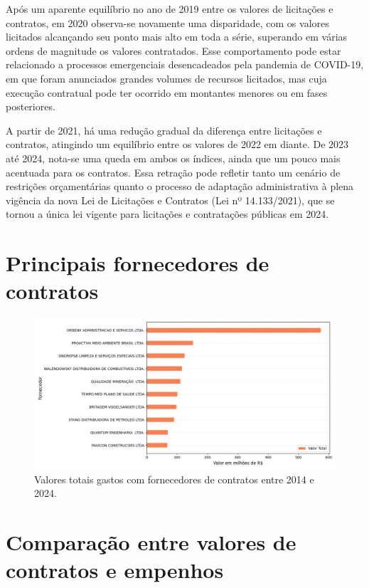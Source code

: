 \documentclass[
	12pt,				%
	oneside,			%
	a4paper,			%
	chapter=TITLE,		%
	section=TITLE,		%
	english,			%
	brazil				%
	]{abntex2}
\begin{document}
Após um aparente equilíbrio no ano de 2019 entre os valores de licitações e contratos, em 2020 observa-se novamente uma disparidade, com os valores licitados alcançando seu ponto mais alto em toda a série, superando em várias ordens de magnitude os valores contratados. Esse comportamento pode estar relacionado a processos emergenciais desencadeados pela pandemia de COVID-19, em que foram anunciados grandes volumes de recursos licitados, mas cuja execução contratual pode ter ocorrido em montantes menores ou em fases posteriores.

A partir de 2021, há uma redução gradual da diferença entre licitações e contratos, atingindo um equilíbrio entre os valores de 2022 em diante. De 2023 até 2024, nota-se uma queda em ambos os índices, ainda que um pouco mais acentuada para os contratos. Essa retração pode refletir tanto um cenário de restrições orçamentárias quanto o processo de adaptação administrativa à plena vigência da nova Lei de Licitações e Contratos (Lei nº 14.133/2021), que se tornou a única lei vigente para licitações e contratações públicas em 2024.

\section*{Principais fornecedores de contratos}

\begin{figure}[h]
	\begin{center}
		\caption{\label{fig:fornecedores}Valores totais gastos com fornecedores de contratos entre 2014 e 2024.}
		\includegraphics[scale=0.41,clip]{images/principais_fornecedores.png} %
	\end{center}
\end{figure}

\section*{Comparação entre valores de contratos e empenhos}
\end{document}
